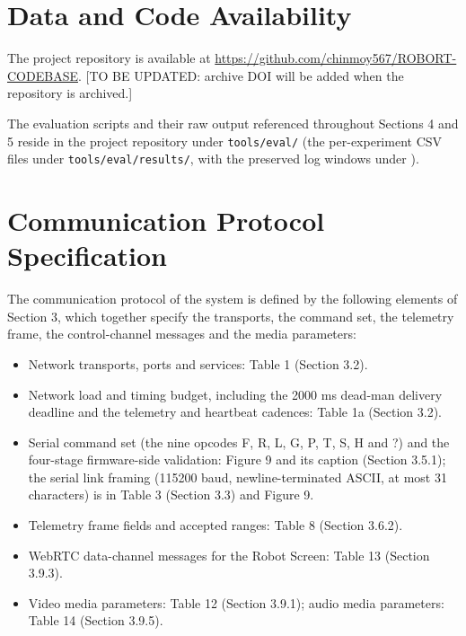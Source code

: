 \documentclass[12pt,a4paper]{report}
\begin{document}
\chapter*{Data and Code Availability}

The project repository is available at \url{https://github.com/chinmoy567/ROBORT-CODEBASE}. [TO BE UPDATED: archive DOI will be added when the repository is archived.]

The evaluation scripts and their raw output referenced throughout Sections 4 and 5 reside in the project repository under \texttt{tools/eval/} (the per-experiment CSV files under \texttt{tools/eval/results/}, with the preserved log windows under \texttt{}).

\clearpage

\nocite{*}
\renewcommand{\bibname}{REFERENCE}



\appendix

\chapter{Communication Protocol Specification}

The communication protocol of the system is defined by the following elements of Section 3, which together specify the transports, the command set, the telemetry frame, the control-channel messages and the media parameters:

\begin{itemize}
\item Network transports, ports and services: Table 1 (Section 3.2).
\item Network load and timing budget, including the 2000 ms dead-man delivery deadline and the telemetry and heartbeat cadences: Table 1a (Section 3.2).
\item Serial command set (the nine opcodes F, R, L, G, P, T, S, H and ?) and the four-stage firmware-side validation: Figure 9 and its caption (Section 3.5.1); the serial link framing (115200 baud, newline-terminated ASCII, at most 31 characters) is in Table 3 (Section 3.3) and Figure 9.
\item Telemetry frame fields and accepted ranges: Table 8 (Section 3.6.2).
\item WebRTC data-channel messages for the Robot Screen: Table 13 (Section 3.9.3).
\item Video media parameters: Table 12 (Section 3.9.1); audio media parameters: Table 14 (Section 3.9.5).
\end{itemize}
\end{document}
